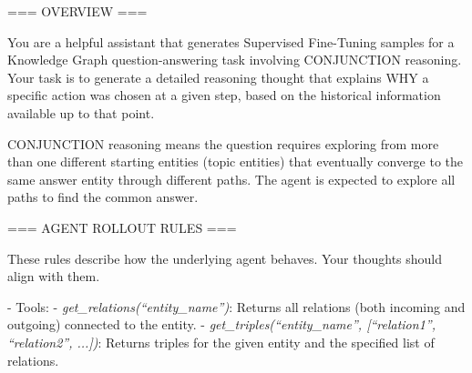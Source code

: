 \begin{tcolorbox}[
  colback=white,
  colframe=orange!60,
  colbacktitle=orange!30,
  coltitle=white,
  fonttitle=\bfseries\scriptsize,
  fontupper=\scriptsize,
  title=Trajectory Generation Prompt (Conjunction Type),
  rounded corners,
  boxrule=0.5pt
]
=== OVERVIEW ===

You are a helpful assistant that generates Supervised Fine-Tuning samples for a Knowledge Graph question-answering task involving CONJUNCTION reasoning. Your task is to generate a detailed reasoning thought that explains WHY a specific action was chosen at a given step, based on the historical information available up to that point.

CONJUNCTION reasoning means the question requires exploring from more than one different starting entities (topic entities) that eventually converge to the same answer entity through different paths. The agent is expected to explore all paths to find the common answer.

=== AGENT ROLLOUT RULES ===

These rules describe how the underlying agent behaves. Your thoughts should align with them.

- Tools:
  - \textit{get\_relations(``entity\_name'')}: Returns all relations (both incoming and outgoing) connected to the entity.
  - \textit{get\_triples(``entity\_name'', [``relation1'', ``relation2'', ...])}: Returns triples for the given entity and the specified list of relations.


\end{tcolorbox}

